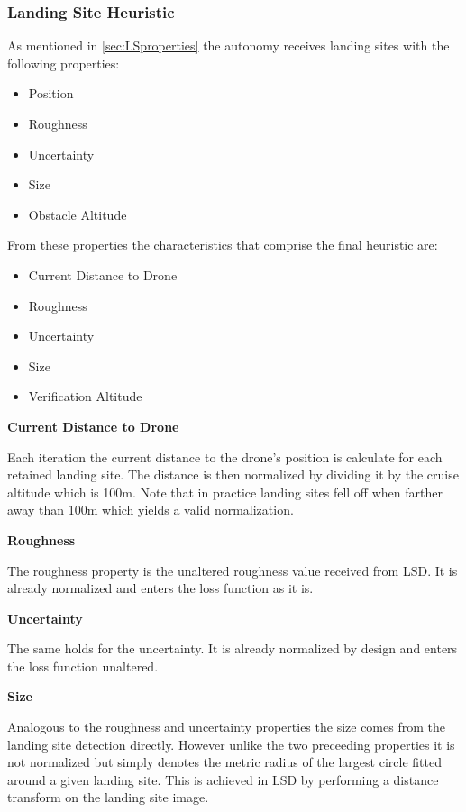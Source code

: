\subsubsection{Landing Site Heuristic}\label{subsubsec:LandingSiteHeuristic}

As mentioned in \cref{sec:LSproperties} the autonomy receives landing sites with the following properties:

\begin{itemize}
    \item Position
    \item Roughness
    \item Uncertainty
    \item Size
    \item Obstacle Altitude
\end{itemize}

From these properties the characteristics that comprise the final heuristic are:

\begin{itemize}
    \item Current Distance to Drone
    \item Roughness
    \item Uncertainty
    \item Size
    \item Verification Altitude
\end{itemize}

\textbf{Current Distance to Drone}

Each iteration the current distance to the drone's position is calculate for each retained landing site. The distance is then normalized by dividing it by the cruise altitude which is 100m. Note that in practice landing sites fell off when farther away than 100m which yields a valid normalization. %
\clearpage

\textbf{Roughness}

The roughness property is the unaltered roughness value received from LSD. It is already normalized and enters the loss function as it is. 

\textbf{Uncertainty}

The same holds for the uncertainty. It is already normalized by design and enters the loss function unaltered.

\textbf{Size}

Analogous to the roughness and uncertainty properties the size comes from the landing site detection directly. However unlike the two preceeding properties it is not normalized but simply denotes the metric radius of the largest circle fitted around a given landing site. This is achieved in LSD by performing a distance transform on the landing site image.

